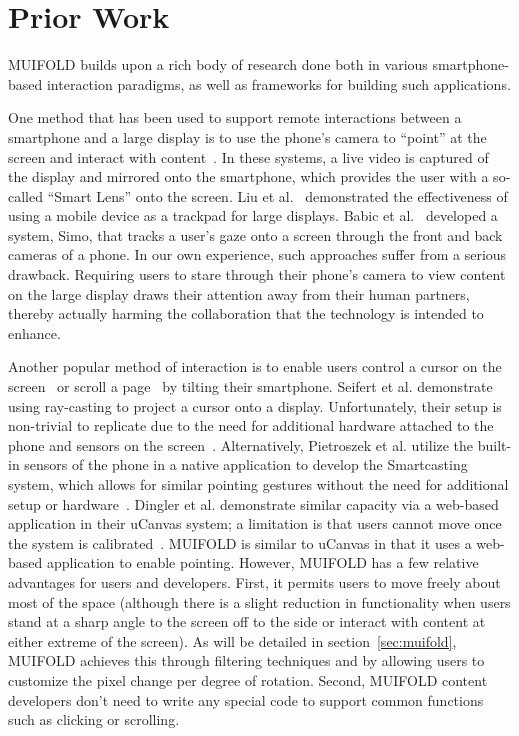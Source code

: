 \section{Prior Work}

MUIFOLD builds upon a rich body of research done both in
various smartphone-based interaction paradigms, as well as frameworks
for building such applications.

One method that has been used to support remote interactions between a smartphone and a large display is to use the
phone's camera to ``point'' at the screen and interact with
content~\cite{boring_touch_2010,jeon_interaction_2010}. In these
systems, a live video is captured of the display and mirrored onto
the smartphone, which provides the user with a
so-called ``Smart Lens'' onto the screen. Liu et al.~\cite{liu_effects_2014} demonstrated the effectiveness of using a
mobile device as a trackpad for large
displays. Babic et al.~\cite{babic_simo_2020} developed a system, Simo, that tracks a user's gaze onto a screen through the
front and back cameras of a phone. In our own experience, such approaches suffer from a serious drawback. Requiring users to stare through their phone's camera to view content on the large display draws their attention away from their human partners, thereby actually harming the collaboration that the technology is intended to enhance.

Another popular method of interaction is to enable users control a cursor on the
screen~\cite{boring_scroll_2009} or scroll a
page~\cite{oakley_tilt_2005} by tilting their smartphone. Seifert et al. demonstrate using ray-casting to project a cursor onto a display. Unfortunately,
their setup is non-trivial to replicate due to the need for
additional hardware attached to the phone and sensors on the
screen~\cite{hutchison_pointerphone:_2013}. Alternatively,
Pietroszek et al. utilize the built-in sensors of the phone in a
native application to develop the Smartcasting system, which
allows for similar pointing gestures without the need for
additional setup or hardware~\cite{pietroszek_smartcasting:_2014}.
Dingler et al. demonstrate  similar capacity via
a web-based application in their uCanvas system; a limitation is that users cannot move once the system is
calibrated~\cite{abascal_ucanvas_2015}. MUIFOLD is similar to uCanvas in that it uses a web-based application to enable pointing. However, MUIFOLD has a few relative advantages for users and developers. First, it permits users to move freely about most of the space (although there is a slight reduction in functionality when
users stand at a sharp angle to the screen off to the side or
interact with content at either extreme of the screen). As will be detailed in section~\ref{sec:muifold}, MUIFOLD
achieves this through filtering techniques and by allowing users to customize the pixel change per degree of rotation. Second, MUIFOLD
content developers don't need to write any special code to support common functions such as clicking or scrolling.

